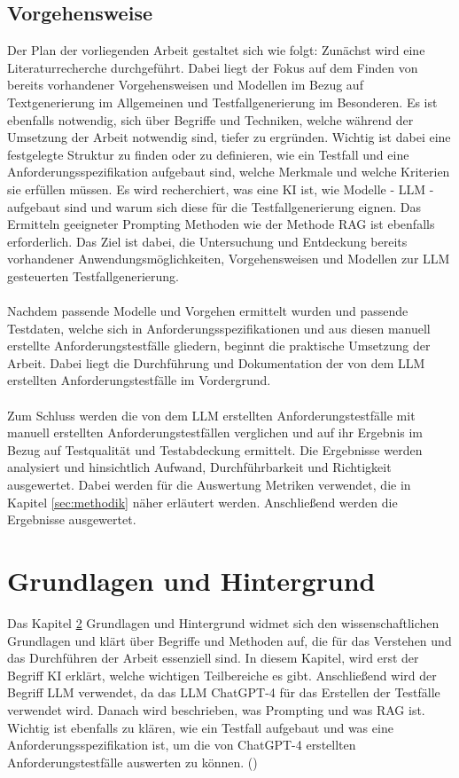 \documentclass[12pt,toc=bib,toc=listof]{scrreprt}
\begin{document}
\section{Vorgehensweise} %
\label{sec:vorgehensweise}
Der Plan der vorliegenden Arbeit gestaltet sich wie folgt: Zunächst wird eine Literaturrecherche durchgeführt. Dabei liegt der Fokus auf dem Finden von bereits vorhandener Vorgehensweisen und Modellen im Bezug auf Textgenerierung im Allgemeinen und Testfallgenerierung im Besonderen. Es ist ebenfalls notwendig, sich über Begriffe und Techniken, welche während der Umsetzung der Arbeit notwendig sind, tiefer zu ergründen. Wichtig ist dabei eine festgelegte Struktur zu finden oder zu definieren, wie ein Testfall und eine Anforderungsspezifikation aufgebaut sind, welche Merkmale und welche Kriterien sie erfüllen müssen. Es wird recherchiert, was eine KI ist, wie Modelle - LLM - aufgebaut sind und warum sich diese für die Testfallgenerierung eignen. Das Ermitteln geeigneter Prompting Methoden wie der Methode RAG ist ebenfalls erforderlich. Das Ziel ist dabei, die Untersuchung und Entdeckung bereits vorhandener Anwendungsmöglichkeiten, Vorgehensweisen und Modellen zur LLM gesteuerten Testfallgenerierung.\\
\\
Nachdem passende Modelle und Vorgehen ermittelt wurden und passende Testdaten, welche sich in Anforderungsspezifikationen und aus diesen manuell erstellte Anforderungstestfälle gliedern, beginnt die praktische Umsetzung der Arbeit. Dabei liegt die Durchführung und Dokumentation der von dem LLM erstellten Anforderungstestfälle im Vordergrund.\\
\\
Zum Schluss werden die von dem LLM erstellten Anforderungstestfälle mit manuell erstellten Anforderungstestfällen verglichen und auf ihr Ergebnis im Bezug auf Testqualität und Testabdeckung ermittelt. Die Ergebnisse werden analysiert und hinsichtlich Aufwand, Durchführbarkeit und Richtigkeit ausgewertet. Dabei werden für die Auswertung Metriken verwendet, die in Kapitel \ref{sec:methodik} näher erläutert werden. Anschließend werden die Ergebnisse ausgewertet.

\chapter{Grundlagen und Hintergrund} %
\label{sec:grundlagenUndHintergrund}
Das Kapitel \ref{sec:grundlagenUndHintergrund} Grundlagen und Hintergrund widmet sich den wissenschaftlichen Grundlagen und klärt über Begriffe und Methoden auf, die für das Verstehen und das Durchführen der Arbeit essenziell sind. In diesem Kapitel, wird erst der Begriff KI erklärt, welche wichtigen Teilbereiche es gibt. Anschließend wird der Begriff LLM verwendet, da das LLM ChatGPT-4 für das Erstellen der Testfälle verwendet wird. Danach wird beschrieben, was Prompting und was RAG ist. Wichtig ist ebenfalls zu klären, wie ein Testfall aufgebaut und was eine Anforderungsspezifikation ist, um die von ChatGPT-4 erstellten Anforderungstestfälle auswerten zu können. (\cite{OpenAI2025})
\end{document}
